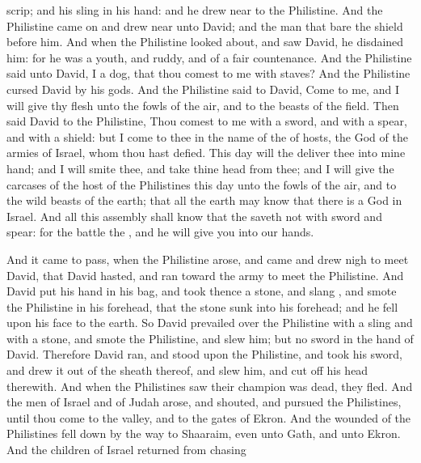 {scrip; and his
sling
{} in his
hand: and he drew
near to the
Philistine.
And the
Philistine
came
on and drew
near unto
David; and the
man that
bare the
shield
{}
before him.
And when the
Philistine looked
about, and
saw
David, he
disdained him: for he was
{} a
youth, and
ruddy, and of a
fair
countenance.
And the
Philistine
said unto
David,
{} I a
dog, that thou
comest to me with
staves? And the
Philistine
cursed
David by his
gods.
And the
Philistine
said to
David,
Come to me, and I will
give thy
flesh unto the
fowls of the
air, and to the
beasts of the
field.
Then
said
David to the
Philistine, Thou
comest to me with a
sword, and with a
spear, and with a
shield: but I
come to thee in the
name of the
{} of
hosts, the
God of the
armies of
Israel, whom thou hast
defied.
This
day will the
{}
deliver thee into mine
hand; and I will
smite thee, and
take thine
head from thee; and I will
give the
carcases of the
host of the
Philistines this
day unto the
fowls of the
air, and to the wild
beasts of the
earth; that all the
earth may
know that there
is a
God in
Israel.
And all this
assembly shall
know that the
{}
saveth not with
sword and
spear: for the
battle
{} the
{}, and he will
give you into our
hands.
\par }{\PP {}And it came to pass, when the
Philistine
arose, and
came and drew
nigh to
meet
David, that
David
hasted, and
ran toward the
army to
meet the
Philistine.
And
David
put his
hand in his
bag, and
took thence a
stone, and
slang
{}, and
smote the
Philistine in his
forehead, that the
stone
sunk into his
forehead; and he
fell upon his
face to the
earth.
So
David
prevailed
over the
Philistine with a
sling and with a
stone, and
smote the
Philistine, and
slew him; but
{} no
sword in the
hand of
David.
Therefore
David
ran, and
stood upon the
Philistine, and
took his
sword, and
drew it out of the
sheath thereof, and
slew him, and cut
off his
head therewith. And when the
Philistines
saw their
champion was
dead, they
fled.
And the
men of
Israel and of
Judah
arose, and
shouted, and
pursued the
Philistines, until thou
come to the
valley, and to the
gates of
Ekron. And the
wounded of the
Philistines fell
down by the
way to
Shaaraim, even unto
Gath, and unto
Ekron.
And the
children of
Israel
returned from
chasing
}
